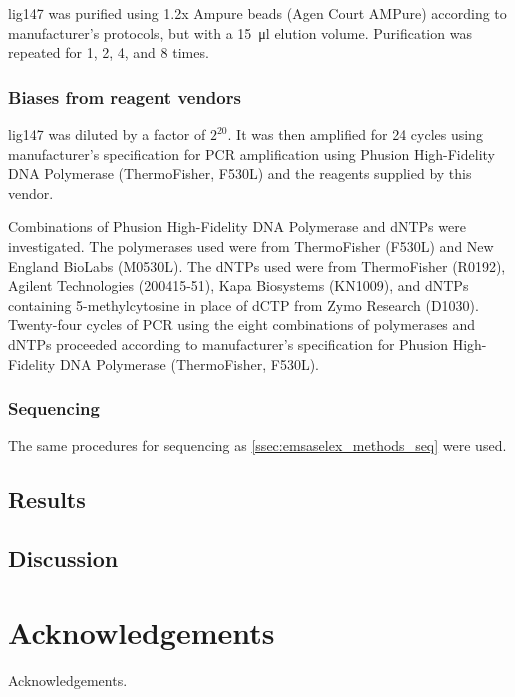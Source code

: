 \documentclass[parskip=full, numbers=noenddot]{scrreprt}
\begin{document}
lig147 was purified using 1.2x Ampure beads (Agen Court AMPure) according to manufacturer's protocols, but with a \SI{15}{\micro\litre} elution volume.  Purification was repeated for 1, 2, 4, and 8 times.

\subsection{Biases from reagent vendors}
\label{ssec:pcrbias_methods_reagent}

lig147 was diluted by a factor of $2^{20}$.  It was then amplified for 24 cycles using manufacturer's specification for PCR amplification using Phusion High-Fidelity DNA Polymerase (ThermoFisher, F530L) and the reagents supplied by this vendor.

Combinations of Phusion High-Fidelity DNA Polymerase and dNTPs were investigated.  The polymerases used were from ThermoFisher (F530L) and New England BioLabs (M0530L).  The dNTPs used were from ThermoFisher (R0192), Agilent Technologies (200415-51), Kapa Biosystems (KN1009), and dNTPs containing 5-methylcytosine in place of dCTP from Zymo Research (D1030).  Twenty-four cycles of PCR using the eight combinations of polymerases and dNTPs proceeded according to manufacturer's specification for Phusion High-Fidelity DNA Polymerase (ThermoFisher, F530L).

\subsection{Sequencing}
\label{ssec:pcrbias_methods_seq}

The same procedures for sequencing as \ref{ssec:emsaselex_methods_seq} were used.


\section{Results}
\label{sec:pcrbias_results}

\section{Discussion}
\label{sec:pcrbias_discussion}

\chapter{Acknowledgements}
\label{ch:ack}

Acknowledgements.

\printbibliography
\end{document}
